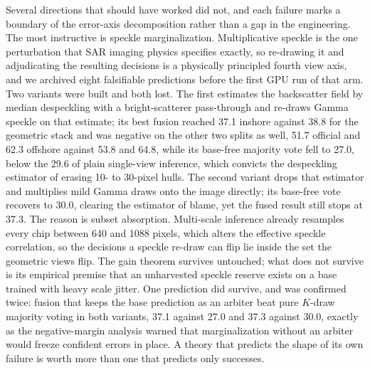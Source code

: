 Several directions that should have worked did not, and each failure marks a boundary of the error-axis decomposition rather than a gap in the engineering. The most instructive is speckle marginalization. Multiplicative speckle is the one perturbation that SAR imaging physics specifies exactly, so re-drawing it and adjudicating the resulting decisions is a physically principled fourth view axis, and we archived eight falsifiable predictions before the first GPU run of that arm. Two variants were built and both lost. The first estimates the backscatter field by median despeckling with a bright-scatterer pass-through and re-draws Gamma speckle on that estimate; its best fusion reached 37.1 inshore against 38.8 for the geometric stack and was negative on the other two splits as well, 51.7 official and 62.3 offshore against 53.8 and 64.8, while its base-free majority vote fell to 27.0, below the 29.6 of plain single-view inference, which convicts the despeckling estimator of erasing 10- to 30-pixel hulls. The second variant drops that estimator and multiplies mild Gamma draws onto the image directly; its base-free vote recovers to 30.0, clearing the estimator of blame, yet the fused result still stops at 37.3. The reason is subset absorption. Multi-scale inference already resamples every chip between 640 and 1088 pixels, which alters the effective speckle correlation, so the decisions a speckle re-draw can flip lie inside the set the geometric views flip. The gain theorem survives untouched; what does not survive is its empirical premise that an unharvested speckle reserve exists on a base trained with heavy scale jitter. One prediction did survive, and was confirmed twice: fusion that keeps the base prediction as an arbiter beat pure $K$-draw majority voting in both variants, 37.1 against 27.0 and 37.3 against 30.0, exactly as the negative-margin analysis warned that marginalization without an arbiter would freeze confident errors in place. A theory that predicts the shape of its own failure is worth more than one that predicts only successes.

